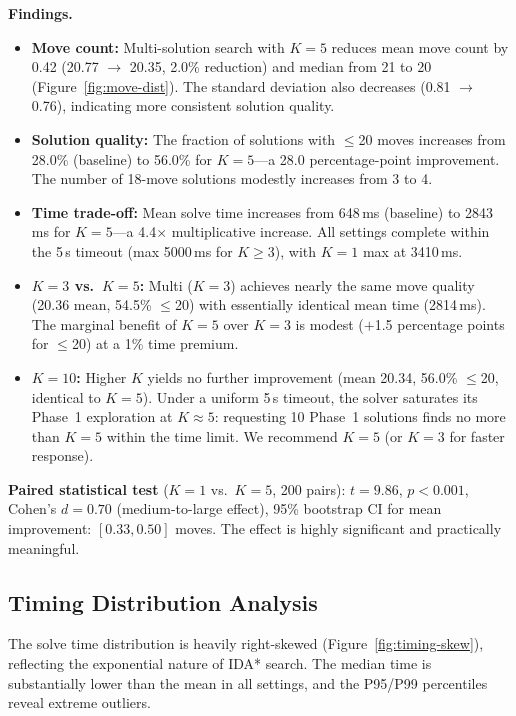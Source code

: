 \documentclass[conference]{IEEEtran}
\begin{document}
\textbf{Findings.}
\begin{itemize}[leftmargin=*]
  \item \textbf{Move count:} Multi-solution search with $K=5$ reduces mean move count by 0.42 (20.77 $\to$ 20.35, 2.0\% reduction) and median from 21 to 20 (Figure~\ref{fig:move-dist}). The standard deviation also decreases (0.81 $\to$ 0.76), indicating more consistent solution quality.
  \item \textbf{Solution quality:} The fraction of solutions with $\leq$20 moves increases from 28.0\% (baseline) to 56.0\% for $K=5$---a 28.0 percentage-point improvement. The number of 18-move solutions modestly increases from 3 to 4.
  \item \textbf{Time trade-off:} Mean solve time increases from 648\,ms (baseline) to 2843\,ms for $K=5$---a 4.4$\times$ multiplicative increase. All settings complete within the 5\,s timeout (max 5000\,ms for $K \geq 3$), with $K{=}1$ max at 3410\,ms.
  \item \textbf{$K=3$ vs.\ $K=5$:} Multi ($K=3$) achieves nearly the same move quality (20.36 mean, 54.5\% $\leq$20) with essentially identical mean time (2814\,ms). The marginal benefit of $K=5$ over $K=3$ is modest ($+$1.5 percentage points for $\leq$20) at a 1\% time premium.
  \item \textbf{$K=10$:} Higher $K$ yields no further improvement (mean 20.34, 56.0\% $\leq$20, identical to $K{=}5$). Under a uniform 5\,s timeout, the solver saturates its Phase~1 exploration at $K \approx 5$: requesting 10 Phase~1 solutions finds no more than $K{=}5$ within the time limit. We recommend $K=5$ (or $K=3$ for faster response).
\end{itemize}

\textbf{Paired statistical test} ($K{=}1$ vs.\ $K{=}5$, 200 pairs): $t = 9.86$, $p < 0.001$, Cohen's $d = 0.70$ (medium-to-large effect), 95\% bootstrap CI for mean improvement: $[0.33, 0.50]$ moves. The effect is highly significant and practically meaningful.

\FloatBarrier
\subsection{Timing Distribution Analysis}
\label{sec:timing-analysis}

The solve time distribution is heavily right-skewed (Figure~\ref{fig:timing-skew}), reflecting the exponential nature of IDA* search. The median time is substantially lower than the mean in all settings, and the P95/P99 percentiles reveal extreme outliers.
\end{document}
